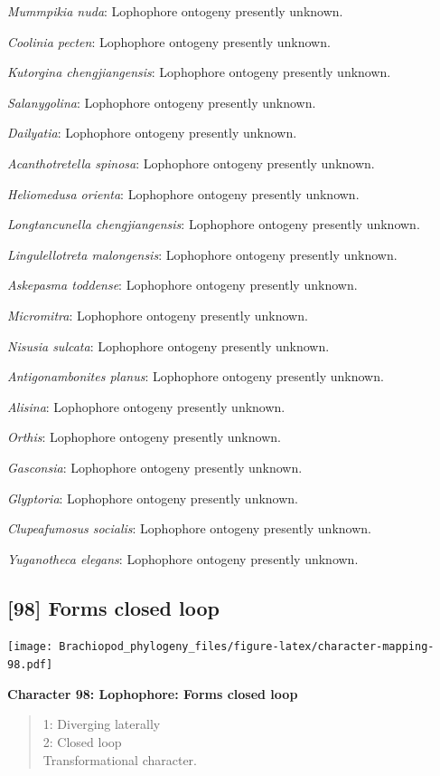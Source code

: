 \documentclass[]{book}
\theoremstyle{definition}
\theoremstyle{definition}
\theoremstyle{definition}
\theoremstyle{remark}
\begin{document}
\emph{Mummpikia nuda}: Lophophore ontogeny presently unknown.

\emph{Coolinia pecten}: Lophophore ontogeny presently unknown.

\emph{Kutorgina chengjiangensis}: Lophophore ontogeny presently unknown.

\emph{Salanygolina}: Lophophore ontogeny presently unknown.

\emph{Dailyatia}: Lophophore ontogeny presently unknown.

\emph{Acanthotretella spinosa}: Lophophore ontogeny presently unknown.

\emph{Heliomedusa orienta}: Lophophore ontogeny presently unknown.

\emph{Longtancunella chengjiangensis}: Lophophore ontogeny presently
unknown.

\emph{Lingulellotreta malongensis}: Lophophore ontogeny presently
unknown.

\emph{Askepasma toddense}: Lophophore ontogeny presently unknown.

\emph{Micromitra}: Lophophore ontogeny presently unknown.

\emph{Nisusia sulcata}: Lophophore ontogeny presently unknown.

\emph{Antigonambonites planus}: Lophophore ontogeny presently unknown.

\emph{Alisina}: Lophophore ontogeny presently unknown.

\emph{Orthis}: Lophophore ontogeny presently unknown.

\emph{Gasconsia}: Lophophore ontogeny presently unknown.

\emph{Glyptoria}: Lophophore ontogeny presently unknown.

\emph{Clupeafumosus socialis}: Lophophore ontogeny presently unknown.

\emph{Yuganotheca elegans}: Lophophore ontogeny presently unknown.

\hypertarget{forms-closed-loop}{%
\subsection*{{[}98{]} Forms closed loop}\label{forms-closed-loop}}

\texttt{[image: Brachiopod\_phylogeny\_files/figure-latex/character-mapping-98.pdf]}

\textbf{Character 98: Lophophore: Forms closed loop}

\begin{quote}
1: Diverging laterally\\
2: Closed loop\\
Transformational character.
\end{quote}
\end{document}
